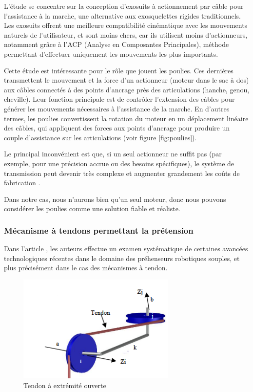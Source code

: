 \documentclass[a4paper, 11pt]{report}
\begin{document}
            L'étude \cite{daniel_rodriguez-jorge_transmission_2023} se concentre sur la conception d'exosuits à actionnement par câble pour l'assistance à la marche, une alternative aux exosquelettes rigides traditionnels. Les exosuits offrent une meilleure compatibilité cinématique avec les mouvements naturels de l'utilisateur, et sont moins chers, car ils utilisent moins d'actionneurs, notamment grâce à l'ACP (Analyse en Composantes Principales), méthode permettant d'effectuer uniquement les mouvements les plus importants.

            Cette étude est intéressante pour le rôle que jouent les poulies. Ces dernières transmettent le mouvement et la force d'un actionneur (moteur dans le sac à dos) aux câbles connectés à des points d'ancrage près des articulations (hanche, genou, cheville). Leur fonction principale est de contrôler l'extension des câbles pour générer les mouvements nécessaires à l'assistance de la marche. En d'autres termes, les poulies convertissent la rotation du moteur en un déplacement linéaire des câbles, qui appliquent des forces aux points d'ancrage pour produire un couple d'assistance sur les articulations (voir figure \ref{fig:poulies}).

            Le principal inconvénient est que, si un seul actionneur ne suffit pas (par exemple, pour une précision accrue ou des besoins spécifiques), le système de transmission peut devenir très complexe et augmenter grandement les coûts de fabrication \cite{daniel_rodriguez-jorge_transmission_2023}.
            
            Dans notre cas, nous n'aurons bien qu'un seul moteur, donc nous pouvons considérer les poulies comme une solution fiable et réaliste.

        \subsubsection{Mécanisme à tendons permettant la prétension}

            Dans l'article \cite{saputro_investigation_2023}, les auteurs effectue un examen systématique de certaines avancées technologiques récentes dans le domaine des préhenseurs robotiques souples, et plus précisément dans le cas des mécanismes à tendon.

            \begin{figure}
                \centering
                \includegraphics[width=0.7\textwidth]{Figures/tendon.png}
                \caption{Tendon à extrémité ouverte \cite{saputro_investigation_2023}}
                \label{fig:tendon}
            \end{figure}
\end{document}
